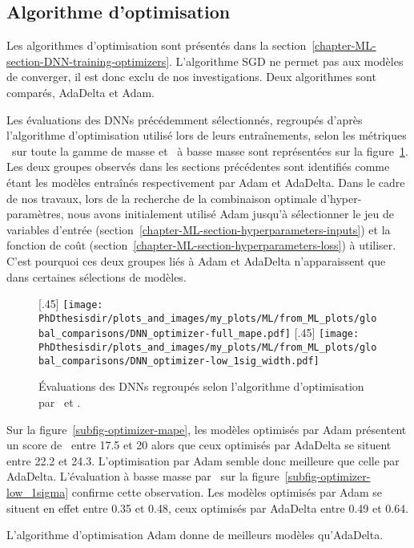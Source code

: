 \subsection{Algorithme d'optimisation}\label{chapter-ML-section-hyperparameters-opti}
Les algorithmes d'optimisation sont présentés dans la section~\ref{chapter-ML-section-DNN-training-optimizers}.
L'algorithme SGD ne permet pas aux modèles de converger, il est donc exclu de nos investigations.
Deux algorithmes sont comparés, AdaDelta et Adam.
\par
Les évaluations des DNNs précédemment sélectionnés,
regroupés d'après l'algorithme d'optimisation utilisé lors de leurs entraînements,
selon les métriques
\LossMAPE\ sur toute la gamme de masse et \OneSigmaWidth\ à basse masse
sont représentées sur la figure~\ref{fig-optimizer}.
Les deux groupes observés dans les sections précédentes sont identifiés comme étant les modèles entraînés respectivement par Adam et AdaDelta.
Dans le cadre de nos travaux, lors de la recherche de la combinaison optimale d'hyper-paramètres,
nous avons initialement utilisé Adam jusqu'à sélectionner
le jeu de variables d'entrée (section~\ref{chapter-ML-section-hyperparameters-inputs})
et
la fonction de coût (section~\ref{chapter-ML-section-hyperparameters-loss}) à utiliser.
C'est pourquoi ces deux groupes liés à Adam et AdaDelta n'apparaissent que dans certaines sélections de modèles.
\begin{figure}[h]
\centering

\subcaptionbox{\label{subfig-optimizer-mape}}[.45\textwidth]
{\texttt{[image: \\PhDthesisdir/plots\_and\_images/my\_plots/ML/from\_ML\_plots/global\_comparisons/DNN\_optimizer-full\_mape.pdf]}\vspace{-\baselineskip}}
\hfill
\subcaptionbox{\label{subfig-optimizer-low_1sigma}}[.45\textwidth]
{\texttt{[image: \\PhDthesisdir/plots\_and\_images/my\_plots/ML/from\_ML\_plots/global\_comparisons/DNN\_optimizer-low\_1sig\_width.pdf]}\vspace{-\baselineskip}}

\caption{Évaluations des DNNs regroupés selon l'algorithme d'optimisation par \LossMAPE\ et \OneSigmaWidth.}
\label{fig-optimizer}
\end{figure}
\par
Sur la figure~\ref{subfig-optimizer-mape},
les modèles optimisés par Adam présentent un score de \LossMAPE\
entre \num{17.5} et \num{20}
alors que ceux optimisés par AdaDelta se situent
entre \num{22.2} et \num{24.3}.
L'optimisation par Adam semble donc meilleure que celle par AdaDelta.
L'évaluation à basse masse par \OneSigmaWidth\ sur la figure~\ref{subfig-optimizer-low_1sigma}
confirme cette observation.
Les modèles optimisés par Adam se situent en effet
entre \num{0.35} et \num{0.48},
ceux optimisés par AdaDelta
entre \num{0.49} et \num{0.64}.
\par
L'algorithme d'optimisation Adam donne de meilleurs modèles qu'AdaDelta.
